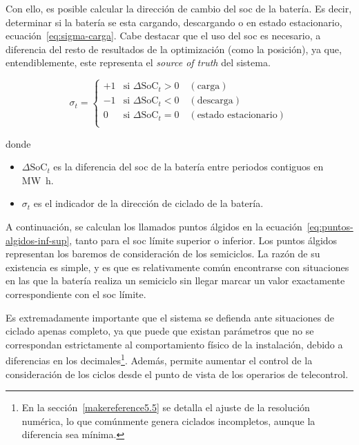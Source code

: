  Con ello, es posible calcular la dirección de cambio del \gls{soc} de la batería. Es decir, determinar si la batería se esta cargando, descargando o en estado estacionario, ecuación~\ref{eq:sigma-carga}. Cabe destacar que el uso del \gls{soc} es necesario, a diferencia del resto de resultados de la optimización (como la posición), ya que, entendiblemente, este representa el \textit{source of truth} del sistema.

  \begin{samepage}

    \begin{equation}
      \label{eq:sigma-carga}
      \sigma_{t} =
      \begin{cases}
        +1 & \text{si } \Delta\mathrm{SoC}_{t} > 0 \quad (\text{carga})               \\
        -1 & \text{si } \Delta\mathrm{SoC}_{t} < 0 \quad (\text{descarga})            \\
        0  & \text{si } \Delta\mathrm{SoC}_{t} = 0 \quad (\text{estado estacionario}) \\
      \end{cases}
    \end{equation}

    donde

    \begin{itemize}

      \item \( \Delta \mathrm{SoC}_{t} \) es la diferencia del \gls{soc} de la batería entre periodos contiguos en \si{{\mega\watt\hour}}.

      \item \( \sigma_{t} \) es el indicador de la dirección de ciclado de la batería.

    \end{itemize}

  \end{samepage}

  A continuación, se calculan los llamados puntos álgidos en la ecuación~\ref{eq:puntos-algidos-inf-sup}, tanto para el \gls{soc} límite superior o inferior. Los puntos álgidos representan los baremos de consideración de los semiciclos. La razón de su existencia es simple, y es que es relativamente común encontrarse con situaciones en las que la batería realiza un semiciclo sin llegar marcar un valor exactamente correspondiente con el \gls{soc} límite.

  Es extremadamente importante que el sistema se defienda ante situaciones de ciclado apenas completo, ya que puede que existan parámetros que no se correspondan estrictamente al comportamiento físico de la instalación, debido a diferencias en los decimales\footnote{En la sección~\ref{makereference5.5} se detalla el ajuste de la resolución numérica, lo que comúnmente genera ciclados incompletos, aunque la diferencia sea mínima.}. Además, permite aumentar el control de la consideración de los ciclos desde el punto de vista de los operarios de telecontrol.

